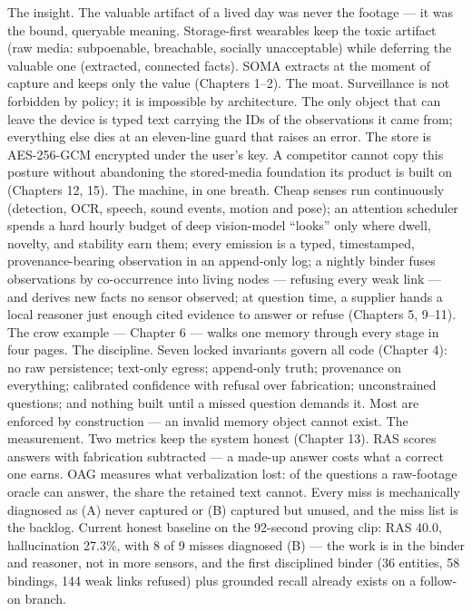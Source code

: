The insight. The valuable artifact of a lived day was never the footage --- it was the bound, queryable meaning. Storage-first wearables keep the toxic artifact (raw media: subpoenable, breachable, socially unacceptable) while deferring the valuable one (extracted, connected facts). SOMA extracts at the moment of capture and keeps only the value (Chapters 1--2). The moat. Surveillance is not forbidden by policy; it is impossible by architecture. The only object that can leave the device is typed text carrying the IDs of the observations it came from; everything else dies at an eleven-line guard that raises an error. The store is AES-256-GCM encrypted under the user's key. A competitor cannot copy this posture without abandoning the stored-media foundation its product is built on (Chapters 12, 15). The machine, in one breath. Cheap senses run continuously (detection, OCR, speech, sound events, motion and pose); an attention scheduler spends a hard hourly budget of deep vision-model ``looks'' only where dwell, novelty, and stability earn them; every emission is a typed, timestamped, provenance-bearing observation in an append-only log; a nightly binder fuses observations by co-occurrence into living nodes --- refusing every weak link --- and derives new facts no sensor observed; at question time, a supplier hands a local reasoner just enough cited evidence to answer or refuse (Chapters 5, 9--11). The crow example --- Chapter 6 --- walks one memory through every stage in four pages. The discipline. Seven locked invariants govern all code (Chapter 4): no raw persistence; text-only egress; append-only truth; provenance on everything; calibrated confidence with refusal over fabrication; unconstrained questions; and nothing built until a missed question demands it. Most are enforced by construction --- an invalid memory object cannot exist. The measurement. Two metrics keep the system honest (Chapter 13). RAS scores answers with fabrication subtracted --- a made-up answer costs what a correct one earns. OAG measures what verbalization lost: of the questions a raw-footage oracle can answer, the share the retained text cannot. Every miss is mechanically diagnosed as (A) never captured or (B) captured but unused, and the miss list is the backlog. Current honest baseline on the 92-second proving clip: RAS 40.0, hallucination 27.3\%, with 8 of 9 misses diagnosed (B) --- the work is in the binder and reasoner, not in more sensors, and the first disciplined binder (36 entities, 58 bindings, 144 weak links refused) plus grounded recall already exists on a follow-on branch.

